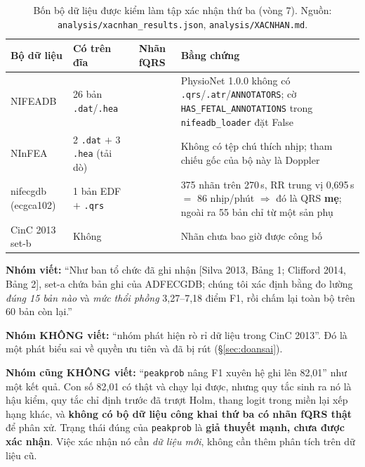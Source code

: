 \begin{table}[H]\centering\small
\caption{Bốn bộ dữ liệu được kiểm làm tập xác nhận thứ ba (vòng 7). Nguồn:
\texttt{analysis/xacnhan\_results.json}, \texttt{analysis/XACNHAN.md}.}
\label{tab:bothuba}
\begin{tabular}{@{}L{2.7cm} L{3.3cm} C{1.8cm} L{6.2cm}@{}}
\toprule
\textbf{Bộ dữ liệu} & \textbf{Có trên đĩa} & \textbf{Nhãn fQRS} & \textbf{Bằng chứng} \\
\midrule
NIFEADB & 26 bản \texttt{.dat}/\texttt{.hea} &  & PhysioNet 1.0.0 không có
\texttt{.qrs}/\texttt{.atr}/\texttt{ANNOTATORS}; cờ \texttt{HAS\_FETAL\_ANNOTATIONS} trong
\texttt{nifeadb\_loader} đặt False \\
NInFEA & 2 \texttt{.dat} $+$ 3 \texttt{.hea} (tải dò) &  & Không có tệp chú thích nhịp;
tham chiếu gốc của bộ này là Doppler \\
nifecgdb (ecgca102) & 1 bản EDF $+$ \texttt{.qrs} &  & 375 nhãn trên 270\,s, RR trung vị
0,695\,s $=$ 86 nhịp/phút $\Rightarrow$ đó là QRS \textbf{mẹ}; ngoài ra 55 bản chỉ từ một sản phụ \\
CinC 2013 set-b & Không &  & Nhãn chưa bao giờ được công bố \\
\bottomrule
\end{tabular}
\end{table}

\begin{canhbao}[title={Phát biểu nhóm dùng cho mục này --- và phát biểu nhóm KHÔNG dùng}]
\textbf{Nhóm viết:} ``Như ban tổ chức đã ghi nhận [Silva 2013, Bảng 1; Clifford 2014, Bảng 2], set-a
chứa bản ghi của ADFECGDB; chúng tôi xác định bằng đo lường \emph{đúng 15 bản nào} và \emph{mức thổi
phồng} 3,27--7,18 điểm F1, rồi chấm lại toàn bộ trên 60 bản còn lại.''

\textbf{Nhóm KHÔNG viết:} ``nhóm phát hiện rò rỉ dữ liệu trong CinC 2013''. Đó là một phát biểu sai về
quyền ưu tiên và đã bị rút (\S\ref{sec:doansai}).

\textbf{Nhóm cũng KHÔNG viết:} ``\texttt{peakprob} nâng F1 xuyên hệ ghi lên 82,01'' như một kết quả.
Con số 82,01 có thật và chạy lại được, nhưng quy tắc sinh ra nó là hậu kiểm, quy tắc chỉ định trước đã
trượt Holm, thang logit trong miền lại xếp hạng khác, và \textbf{không có bộ dữ liệu công khai thứ ba
có nhãn fQRS thật} để phân xử. Trạng thái đúng của \texttt{peakprob} là \textbf{giả thuyết mạnh, chưa
được xác nhận}. Việc xác nhận nó cần \emph{dữ liệu mới}, không cần thêm phân tích trên dữ liệu cũ.
\end{canhbao}
